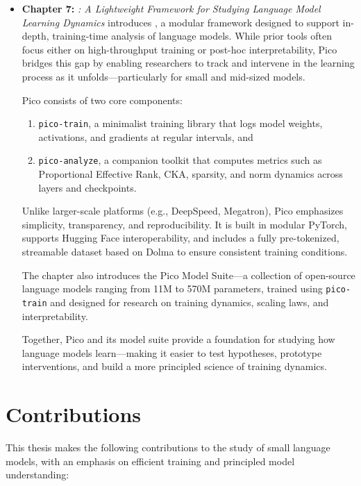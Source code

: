 \begin{itemize}
    \item \textbf{Chapter 7:} \emph{\pico: A Lightweight Framework for Studying Language Model Learning Dynamics} introduces \pico, a modular framework designed to support in-depth, training-time analysis of language models. While prior tools often focus either on high-throughput training or post-hoc interpretability, Pico bridges this gap by enabling researchers to track and intervene in the learning process as it unfolds—particularly for small and mid-sized models.

    Pico consists of two core components:
    
    \begin{enumerate}
        \item \texttt{pico-train}, a minimalist training library that logs model weights, activations, and gradients at regular intervals, and
        
        \item \texttt{pico-analyze}, a companion toolkit that computes metrics such as Proportional Effective Rank, CKA, sparsity, and norm dynamics across layers and checkpoints.
    \end{enumerate}
    
    Unlike larger-scale platforms (e.g., DeepSpeed, Megatron), Pico emphasizes simplicity, transparency, and reproducibility. It is built in modular PyTorch, supports Hugging Face interoperability, and includes a fully pre-tokenized, streamable dataset based on Dolma to ensure consistent training conditions.
    
    The chapter also introduces the Pico Model Suite—a collection of open-source language models ranging from 11M to 570M parameters, trained using \texttt{pico-train} and designed for research on training dynamics, scaling laws, and interpretability.
    
    Together, Pico and its model suite provide a foundation for studying how language models learn—making it easier to test hypotheses, prototype interventions, and build a more principled science of training dynamics.
\end{itemize}

\section*{Contributions}

This thesis makes the following contributions to the study of small language models, with an emphasis on efficient training and principled model understanding:

